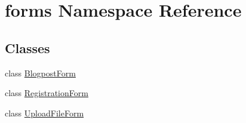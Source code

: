 \hypertarget{namespaceforms}{
\section{forms Namespace Reference}
\label{namespaceforms}
}
\subsection*{Classes}
\begin{DoxyCompactItemize}
\item 
class \hyperlink{classforms_1_1_blogpost_form}{BlogpostForm}
\item 
class \hyperlink{classforms_1_1_registration_form}{RegistrationForm}
\item 
class \hyperlink{classforms_1_1_upload_file_form}{UploadFileForm}
\end{DoxyCompactItemize}
